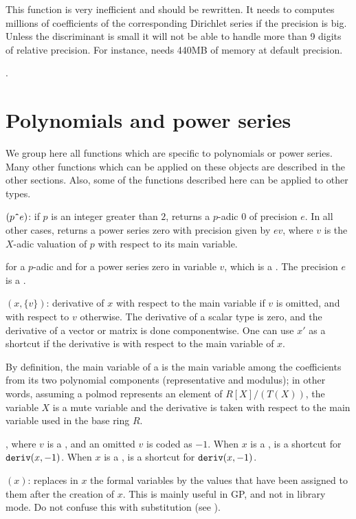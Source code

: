 This function is very inefficient and should be rewritten. It needs to
computes millions of coefficients of the corresponding Dirichlet series if
the precision is big. Unless the discriminant is small it will not be able
to handle more than 9 digits of relative precision. For instance,
 needs 440MB of memory at default precision.

.

\section{Polynomials and power series}

We group here all functions which are specific to polynomials or power
series. Many other functions which can be applied on these objects are
described in the other sections. Also, some of the functions described here
can be applied to other types.

$(p\hbox{{\tt \^{}\hskip0pt}}e)$: if $p$ is an integer
greater than $2$, returns a $p$-adic $0$ of precision $e$. In all other
cases, returns a power series zero with precision given by $e v$, where $v$
is the $X$-adic valuation of $p$ with respect to its main variable.

 for a $p$-adic and  for a
power series zero in variable $v$, which is a . The precision $e$
is a .

$(x,\{v\})$: derivative of $x$ with respect to the main
variable if $v$ is omitted, and with respect to $v$ otherwise. The derivative
of a scalar type is zero, and the derivative of a vector or matrix is done
componentwise. One can use $x'$ as a shortcut if the derivative is with
respect to the main variable of $x$.

By definition, the main variable of a  is the main variable among
the coefficients from its two polynomial components (representative and
modulus); in other words, assuming a polmod represents an element of
$R[X]/(T(X))$, the variable $X$ is a mute variable and the derivative is
taken with respect to the main variable used in the base ring $R$.

, where $v$ is a , and an omitted $v$ is coded as
$-1$. When $x$ is a ,  is a shortcut for
${\tt deriv}(x, -1)$. When $x$ is a ,  is a
shortcut for ${\tt deriv}(x, -1)$.

$(x)$: replaces in $x$ the formal variables by the values that
have been assigned to them after the creation of $x$. This is mainly useful
in GP, and not in library mode. Do not confuse this with substitution (see
).

